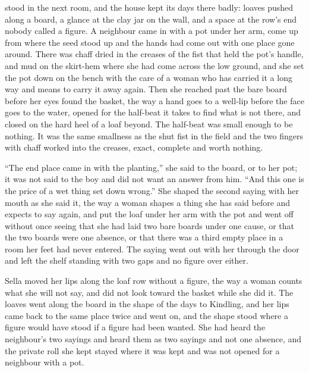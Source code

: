  stood in the next room, and the house kept its days there badly: loaves pushed along a board, a glance at the clay jar on the wall, and a space at the row’s end nobody called a figure. A neighbour came in with a pot under her arm, come up from  where the seed stood up and the hands had come out with one place gone around. There was chaff dried in the creases of the fist that held the pot’s handle, and mud on the skirt-hem where she had come across the low ground, and she set the pot down on the bench with the care of a woman who has carried it a long way and means to carry it away again. Then she reached past the bare board before her eyes found the basket, the way a hand goes to a well-lip before the face goes to the water, opened for the half-beat it takes to find what is not there, and closed on the hard heel of a loaf beyond. The half-beat was small enough to be nothing. It was the same smallness as the shut fist in the field and the two fingers with chaff worked into the creases, exact, complete and worth nothing.

“The end place came in with the planting,” she said to the board, or to her pot; it was not said to the boy and did not want an answer from him. “And this one is the price of a wet thing set down wrong.” She shaped the second saying with her mouth as she said it, the way a woman shapes a thing she has said before and expects to say again, and put the loaf under her arm with the pot and went off without once seeing that she had laid two bare boards under one cause, or that the two boards were one absence, or that there was a third empty place in a room her feet had never entered. The saying went out with her through the door and left the shelf standing with two gaps and no figure over either.

Sella moved her lips along the loaf row without a figure, the way a woman counts what she will not say, and did not look toward the basket while she did it. The loaves went along the board in the shape of the days to Kindling, and her lips came back to the same place twice and went on, and the shape stood where a figure would have stood if a figure had been wanted. She had heard the neighbour’s two sayings and heard them as two sayings and not one absence, and the private roll she kept stayed where it was kept and was not opened for a neighbour with a pot.

